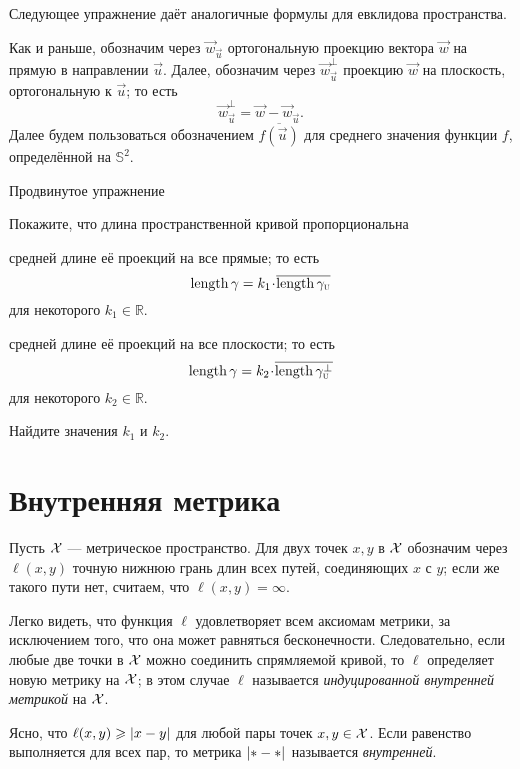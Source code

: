 Следующее упражнение даёт аналогичные формулы для евклидова пространства.

Как и раньше, обозначим через $\vec w_{\vec u}$ ортогональную проекцию вектора $\vec w$ на прямую в направлении $\vec u$.
Далее, обозначим через $\vec w_{\vec u}^\bot$ проекцию $\vec w$ на плоскость, ортогональную к $\vec u$;
то есть
\[\vec w_\vec u^\bot=\vec w - \vec w_{\vec u}.\]
Далее будем пользоваться обозначением 
$\overline{f(\vec u)}$ для среднего значения
функции $f$, определённой на $\mathbb{S}^2$.

\begin{thm}{Продвинутое упражнение}\label{adex:more-croftons}
{\sloppy
Покажите, что длина пространственной кривой пропорциональна 

}
\begin{subthm}{}
средней длине её проекций на все прямые; то есть
\[\length\gamma=k_1\cdot\overline{\length\gamma_{\vec u}}\]
для некоторого $k_1 \in \mathbb{R}$.
\end{subthm}
\begin{subthm}{}средней длине её проекций на все плоскости; то есть
\[\length\gamma=k_2\cdot\overline{\length\gamma_{\vec u}^\bot}\]
для некоторого $k_2 \in \mathbb{R}$.
\end{subthm}
Найдите значения $k_1$ и $k_2$.
\end{thm}



\section{Внутренняя метрика}\label{sec:Length metric}

Пусть $\mathcal{X}$ --- метрическое пространство.
Для двух точек $x,y$ в $\mathcal{X}$ обозначим через $\ell(x,y)$ точную нижнюю грань длин всех путей, соединяющих $x$ с $y$;
если же такого пути нет, считаем, что $\ell(x,y)=\infty$.

Легко видеть, что функция $\ell$ удовлетворяет всем аксиомам метрики, за исключением того, что она может равняться бесконечности.
Следовательно, если любые две точки в $\mathcal{X}$ можно соединить спрямляемой кривой, то $\ell$ определяет новую метрику на $\mathcal{X}$;
в этом случае $\ell$ называется \emph{индуцированной внутренней метрикой} на $\mathcal{X}$.

Ясно, что $\ell(x,y)\ge \dist{x}{y}{}$ для любой пары точек $x,y\in \mathcal{X}$.
Если равенство выполняется для всех пар, то метрика $\dist{{*}}{{*}}{}$ называется \emph{внутренней}.

